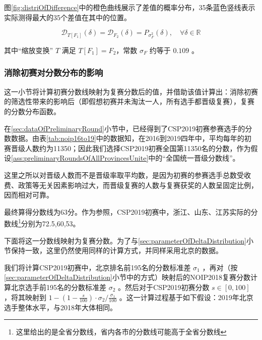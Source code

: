             图\ref{fig:distriOfDifference}中的橙色曲线展示了差值的概率分布，35条蓝色竖线表示实际测得最大的35个差值在其中的位置。

            \begin{proposition}
                $$
                \mathcal{D}_{T\left[F_1\right]}(\delta)=\mathcal{D}_{F_2}(\delta)=P_{\sigma_F^2}(\delta),\quad\forall \delta\in\mathbb{R}
                $$
                
                其中“缩放变换” $T$ 满足 $T\left[F_1\right]=F_2$，常数 $\sigma_F$ 约等于 $0.109$ 。

                \label{prop:deltaDistributionOfF2}
            \end{proposition}

        \subsubsection{消除初赛对分数分布的影响}\label{sec:counteringPreliminaryRound}

            这一小节将计算初赛分数线映射为复赛分数后的值，并借助该值计算出：消除初赛的筛选性带来的影响后（即假想初赛并未淘汰一人，所有选手都晋级复赛），复赛的分数分布函数。

            \vspace{1.5ex}

            在\ref{sec:dataOfPreliminaryRound}小节中，已经得到了CSP2019初赛参赛选手的分数数据。由表\ref{tab:noip16to19}中的数据知，在2016到2019四年中，平均每年的初赛晋级人数约为11350；因此我们选择CSP2019初赛全国第11350名的分数，作为假设\ref{ass:preliminaryRoundsOfAllProvincesUnite}中的“全国统一晋级分数线”。

            这里之所以对晋级人数而不是晋级率取平均数，是因为初赛的参赛选手总数受收费、政策等无关因素影响过大，而晋级复赛的人数与复赛获奖的人数呈固定比例，因而相对可靠。

            最终算得分数线为63分。作为参照，CSP2019初赛中，浙江、山东、江苏实际的分数线\footnote{这里给出的是全省分数线，省内各市的分数线可能高于全省分数线}分别为72.5,60,53。

            \vspace{1.5ex}

            下面将这一分数线映射为复赛分数。为了与\ref{sec:parameterOfDeltaDistribution}小节保持一致，这里仍然使用同样的计算方式，并同样采用北京的数据。
            
            我们将计算CSP2019初赛中，北京排名前195名的分数标准差 $\sigma_1$ ，再对（按\ref{sec:parameterOfDeltaDistribution}小节中的方式）映射后的NOIP2018复赛分数计算北京选手前195名的分数标准差 $\sigma_2$ 。然后对于CSP2019初赛分数 $s\in [0,100]$ ，将其映射到 $1-(1-\frac {s}{100})\cdot\sigma_2/\frac{\sigma_1}{100}$ 。这一计算过程基于如下假设：2019年北京选手整体水平，与2018年大体相同。

